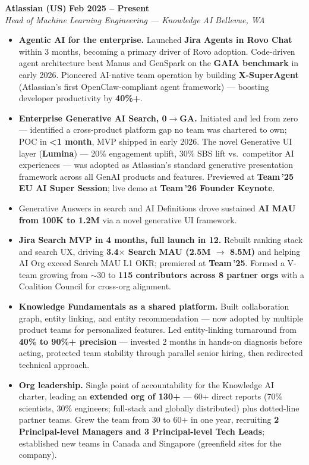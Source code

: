 \documentclass[10.5pt,letterpaper]{article}
\newcommand{\role}[4]{%
  \noindent\textbf{#1} \hfill \textbf{#3}\\
  \textit{#2} \hfill \textit{#4}\par\vspace{2pt}}
\begin{document}
\role{Atlassian (US)}{Head of Machine Learning Engineering --- Knowledge AI}{Feb 2025 -- Present}{Bellevue, WA}
\begin{itemize}
  \item \textbf{Agentic AI for the enterprise.} Launched \textbf{Jira Agents in Rovo Chat} within 3 months, becoming a primary driver of Rovo adoption. Code-driven agent architecture beat Manus and GenSpark on the \textbf{GAIA benchmark} in early 2026. Pioneered AI-native team operation by building \textbf{X-SuperAgent} (Atlassian's first OpenClaw-compliant agent framework) --- boosting developer productivity by \textbf{40\%+}.
  \item \textbf{Enterprise Generative AI Search, 0$\to$GA.} Initiated and led from zero --- identified a cross-product platform gap no team was chartered to own; POC in \textbf{<1 month}, MVP shipped in early 2026. The novel Generative UI layer (\textbf{Lumina}) --- 20\% engagement uplift, 30\% SBS lift vs.\ competitor AI experiences --- was adopted as Atlassian's standard generative presentation framework across all GenAI products and features. Previewed at \textbf{Team\,'25 EU AI Super Session}; live demo at \textbf{Team\,'26 Founder Keynote}.
  \item Generative Answers in search and AI Definitions drove sustained \textbf{AI MAU from 100K to 1.2M} via a novel generative UI framework.
  \item \textbf{Jira Search MVP in 4 months, full launch in 12.} Rebuilt ranking stack and search UX, driving \textbf{3.4$\times$ Search MAU (2.5M $\to$ 8.5M)} and helping AI Org exceed Search MAU L1 OKR; premiered at \textbf{Team\,'25}. Formed a V-team growing from $\sim$30 to \textbf{115 contributors across 8 partner orgs} with a Coalition Council for cross-org alignment.
  \item \textbf{Knowledge Fundamentals as a shared platform.} Built collaboration graph, entity linking, and entity recommendation --- now adopted by multiple product teams for personalized features. Led entity-linking turnaround from \textbf{40\% to 90\%+ precision} --- invested 2 months in hands-on diagnosis before acting, protected team stability through parallel senior hiring, then redirected technical approach.
  \item \textbf{Org leadership.} Single point of accountability for the Knowledge AI charter, leading an \textbf{extended org of 130+} --- 60+ direct reports (70\% scientists, 30\% engineers; full-stack and globally distributed) plus dotted-line partner teams. Grew the team from 30 to 60+ in one year, recruiting \textbf{2 Principal-level Managers and 3 Principal-level Tech Leads}; established new teams in Canada and Singapore (greenfield sites for the company).
\end{itemize}
\end{document}
